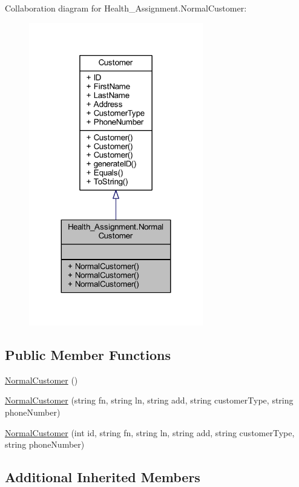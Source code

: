 Collaboration diagram for Health\+\_\+\+Assignment.\+Normal\+Customer\+:\nopagebreak
\begin{figure}[H]
\begin{center}
\leavevmode
\includegraphics[width=215pt]{class_health___assignment_1_1_normal_customer__coll__graph}
\end{center}
\end{figure}
\subsection*{Public Member Functions}
\begin{DoxyCompactItemize}
\item 
\hyperlink{class_health___assignment_1_1_normal_customer_ae3d844ed088f93e9dc04bde11fc48d9b}{Normal\+Customer} ()
\item 
\hyperlink{class_health___assignment_1_1_normal_customer_a30828f3d9dc8877b33f9c698aca18d70}{Normal\+Customer} (string fn, string ln, string add, string customer\+Type, string phone\+Number)
\item 
\hyperlink{class_health___assignment_1_1_normal_customer_acc83b438b258b6d3f840875445d42ac3}{Normal\+Customer} (int id, string fn, string ln, string add, string customer\+Type, string phone\+Number)
\end{DoxyCompactItemize}
\subsection*{Additional Inherited Members}


